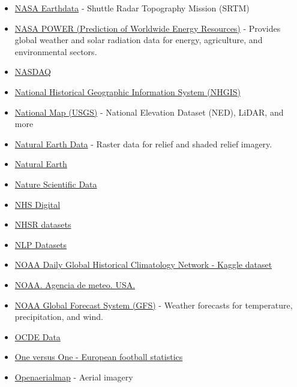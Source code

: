 \documentclass[
  letterpaper,
  DIV=11,
  numbers=noendperiod]{scrartcl}
\begin{document}
\begin{itemize}
  \href{https://firms.modaps.eosdis.nasa.gov/}{Link1}
  \href{https://www.earthdata.nasa.gov/data/tools/firms}{Link2} - Near
  real-time data on wildfires from MODIS and VIIRS satellites.
\item
  \href{https://earthdata.nasa.gov/}{NASA Earthdata} - Shuttle Radar
  Topography Mission (SRTM)
\item
  \href{https://power.larc.nasa.gov/}{NASA POWER (Prediction of
  Worldwide Energy Resources)} - Provides global weather and solar
  radiation data for energy, agriculture, and environmental sectors.
\item
  \href{https://indexes.nasdaqomx.com/Index/History/NQASPA8600AUD}{NASDAQ}
\item
  \href{https://www.nhgis.org/}{National Historical Geographic
  Information System (NHGIS)}
\item
  \href{https://www.usgs.gov/programs/national-geospatial-program/national-map}{National
  Map (USGS)} - National Elevation Dataset (NED), LiDAR, and more
\item
  \href{https://www.naturalearthdata.com/downloads/}{Natural Earth Data}
  - Raster data for relief and shaded relief imagery.
\item
  \href{http://www.naturalearthdata.com/}{Natural Earth}
\item
  \href{https://www.nature.com/sdata/}{Nature Scientific Data}
\item
  \href{digital.nhs.uk/data-and-information/statistical-publications-open-data-and-data-products}{NHS
  Digital}
\item
  \href{https://github.com/nhs-r-community/NHSRdatasets}{NHSR datasets}
\item
  \href{https://github.com/niderhoff/nlp-datasets/blob/master/README.md}{NLP
  Datasets}
\item
  \href{https://www.kaggle.com/noaa/ghcn-d}{NOAA Daily Global Historical
  Climatology Network - Kaggle dataset}
\item
  \href{http://www.nesdis.noaa.gov/index.html}{NOAA. Agencia de meteo.
  USA.}
\item
  \href{https://www.ncei.noaa.gov/}{NOAA Global Forecast System (GFS)} -
  Weather forecasts for temperature, precipitation, and wind.
\item
  \href{https://www.oecd.org/en/data.html}{OCDE Data}
\item
  \href{https://one-versus-one.com/en}{One versus One - European
  football statistics}
\item
  \href{https://openaerialmap.org/}{Openaerialmap} - Aerial imagery

\end{itemize}
\end{document}
